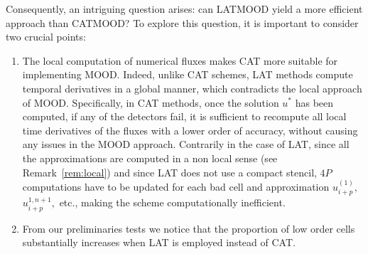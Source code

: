 Consequently, an intriguing question arises: can LATMOOD yield a more efficient approach than CATMOOD? To explore this question, it is important to consider two crucial points: 
\begin{enumerate}
    \item The local computation of numerical fluxes makes CAT more suitable for implementing MOOD. Indeed, unlike CAT schemes, LAT methods compute temporal derivatives in a global manner, which contradicts the local approach of MOOD. Specifically, in CAT methods, once the solution $u^*$ has been computed, if any of the detectors fail, it is sufficient to recompute all local time derivatives of the fluxes with a lower order of accuracy, without causing any issues in the MOOD approach. Contrarily in the case of LAT, since all the approximations are computed in a non local sense (see Remark~\ref{rem:local}) and since LAT does not use a compact stencil, $4P$ computations have to be updated for each bad cell and approximation $u_{i+p}^{(1)},$ $u_{i+p}^{1,n+1},$ etc., making the scheme computationally inefficient.
    \item From our preliminaries tests we notice that the proportion of low order cells substantially increases when LAT is employed instead of CAT. 
\end{enumerate}
